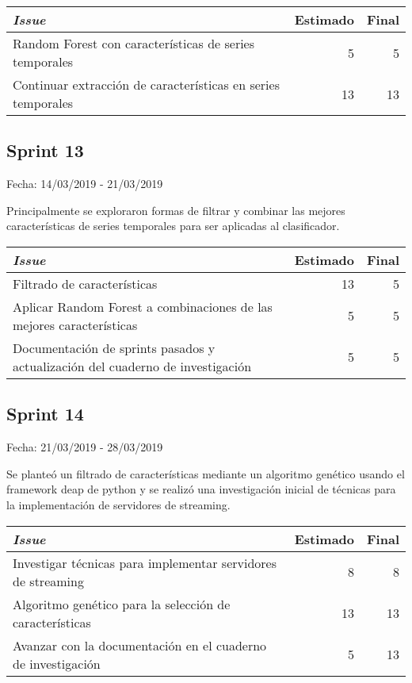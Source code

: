 \begin{table}[h]
	\begin{tabularx}{\textwidth}{|Xrr|}
		\hline \textbf{\textit{Issue}} & \textbf{Estimado} & \textbf{Final}\\
		\hline Random Forest con características de series temporales & 5 & 5 \\
		\hline Continuar extracción de características en series temporales & 13 & 13 \\
		\hline
	\end{tabularx}
\end{table}

\subsection{Sprint 13}

Fecha: 14/03/2019 - 21/03/2019

Principalmente se exploraron formas de filtrar y combinar las mejores características de series temporales para ser aplicadas al clasificador. 

\begin{table}[h]
	\begin{tabularx}{\textwidth}{|Xrr|}
		\hline \textbf{\textit{Issue}} & \textbf{Estimado} & \textbf{Final}\\
		\hline Filtrado de características & 13 & 5 \\
		\hline Aplicar Random Forest a combinaciones de las mejores características & 5 & 5 \\
		\hline Documentación de sprints pasados y actualización del cuaderno de investigación & 5 & 5 \\
		\hline
	\end{tabularx}
\end{table}

\subsection{Sprint 14}

Fecha: 21/03/2019 - 28/03/2019

Se planteó un filtrado de características mediante un algoritmo genético usando el framework deap de python y se realizó una investigación inicial de técnicas para la implementación de servidores de streaming. 

\begin{table}[h]
	\begin{tabularx}{\textwidth}{|Xrr|}
		\hline \textbf{\textit{Issue}} & \textbf{Estimado} & \textbf{Final}\\
		\hline Investigar técnicas para implementar servidores de streaming & 8 & 8 \\
		\hline Algoritmo genético para la selección de características & 13 & 13 \\
		\hline Avanzar con la documentación en el cuaderno de investigación & 5 & 13 \\
		\hline
	\end{tabularx}
\end{table}

